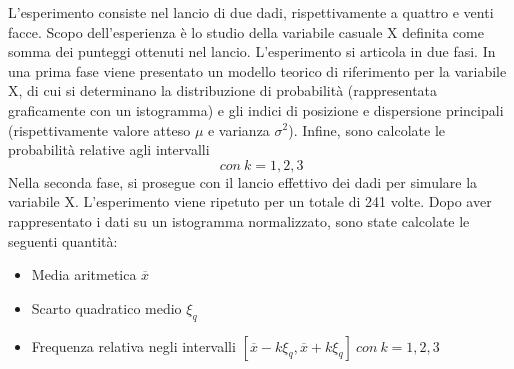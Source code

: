 L'esperimento consiste nel lancio di due dadi, rispettivamente a quattro e venti facce. Scopo dell'esperienza è lo studio della variabile casuale X definita come somma dei punteggi ottenuti nel lancio. L'esperimento si articola in due fasi. In una prima fase viene presentato un modello teorico di riferimento per la variabile X, di cui si determinano la distribuzione di probabilità (rappresentata graficamente con un istogramma) e gli indici di posizione e dispersione principali (rispettivamente valore atteso $\mu$ e varianza $\sigma^2$). Infine, sono calcolate le probabilità relative agli intervalli
\begin{equation}
	[\mu-k\sigma, \mu+k\sigma]\ con\ k=1,2,3
\end{equation} 
Nella seconda fase, si prosegue con il lancio effettivo dei dadi per simulare la variabile X. L'esperimento viene ripetuto per un totale di 241 volte. Dopo aver rappresentato i dati su un istogramma normalizzato, sono state calcolate le seguenti quantità:
\begin{itemize}
	\item Media aritmetica $\overline{x}$ 
	\item Scarto quadratico medio $\xi_q$
	\item Frequenza relativa negli intervalli $[\overline{x}-k\xi_q, \overline{x}+k\xi_q]\ con\ k=1,2,3$
\end{itemize}